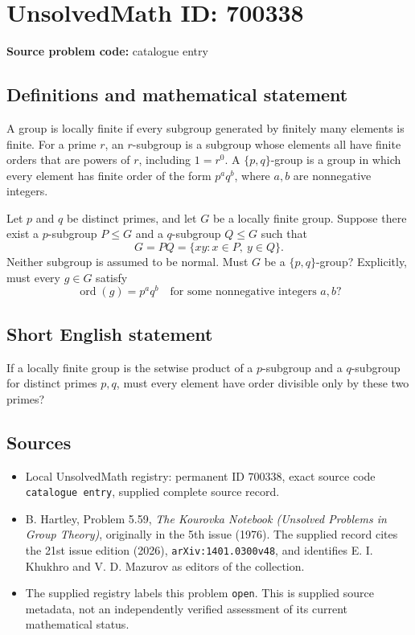 \documentclass[11pt]{article}
\begin{document}
\section*{UnsolvedMath ID: 700338}
\textbf{Source problem code:} catalogue entry
\subsection{Definitions and mathematical statement}
A group is locally finite if every subgroup generated by finitely many elements is finite. For a prime \(r\), an \(r\)-subgroup is a subgroup whose elements all have finite orders that are powers of \(r\), including \(1=r^0\). A \(\{p,q\}\)-group is a group in which every element has finite order of the form \(p^a q^b\), where \(a,b\) are nonnegative integers.

Let \(p\) and \(q\) be distinct primes, and let \(G\) be a locally finite group. Suppose there exist a \(p\)-subgroup \(P\leq G\) and a \(q\)-subgroup \(Q\leq G\) such that
\[
G=PQ=\{xy:x\in P,\ y\in Q\}.
\]
Neither subgroup is assumed to be normal. Must \(G\) be a \(\{p,q\}\)-group? Explicitly, must every \(g\in G\) satisfy
\[
\operatorname{ord}(g)=p^a q^b
\quad\text{for some nonnegative integers }a,b?
\]
\subsection{Short English statement}
If a locally finite group is the setwise product of a \(p\)-subgroup and a \(q\)-subgroup for distinct primes \(p,q\), must every element have order divisible only by these two primes?
\subsection{Sources}
\begin{itemize}
\item Local UnsolvedMath registry: permanent ID \(700338\), exact source code \texttt{catalogue entry}, supplied complete source record.
\item B. Hartley, Problem 5.59, \emph{The Kourovka Notebook (Unsolved Problems in Group Theory)}, originally in the 5th issue (1976). The supplied record cites the 21st issue edition (2026), \texttt{arXiv:1401.0300v48}, and identifies E. I. Khukhro and V. D. Mazurov as editors of the collection.
\item The supplied registry labels this problem \texttt{open}. This is supplied source metadata, not an independently verified assessment of its current mathematical status.
\end{itemize}
\end{document}
